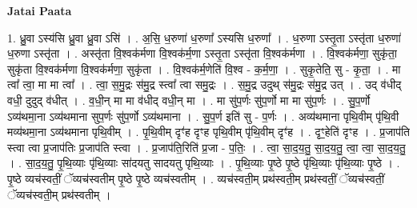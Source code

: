\documentclass[17pt]{extarticle}
\begin{document}
\textbf{Jatai Paata} \newline

1. ध्रु॒वा ऽस्य॑सि ध्रु॒वा ध्रु॒वा ऽसि॑ । . अ॒सि॒ ध॒रुणा॑ ध॒रुणा᳚ ऽस्यसि ध॒रुणा᳚ । . ध॒रुणा ऽस्तृ॒ता ऽस्तृ॑ता ध॒रुणा॑ ध॒रुणा ऽस्तृ॑ता । . अस्तृ॑ता वि॒श्वक॑र्मणा वि॒श्वक॑र्म॒णा ऽस्तृ॒ता ऽस्तृ॑ता वि॒श्वक॑र्मणा । . वि॒श्वक॑र्मणा॒ सुकृ॑ता॒ सुकृ॑ता वि॒श्वक॑र्मणा वि॒श्वक॑र्मणा॒ सुकृ॑ता । . वि॒श्वक॑र्म॒णेति॑ वि॒श्व - क॒र्म॒णा॒ । . सुकृ॒तेति॒ सु - कृ॒ता॒ । . मा त्वा᳚ त्वा॒ मा मा त्वा᳚ । . त्वा॒ स॒मु॒द्रः स॑मु॒द्र स्त्वा᳚ त्वा समु॒द्रः । . स॒मु॒द्र उदुथ् स॑मु॒द्रः स॑मु॒द्र उत् । . उद् व॑धीद् वधी॒ दुदुद् व॑धीत् । . व॒धी॒न् मा मा व॑धीद् वधी॒न् मा । . मा सु॑प॒र्णः सु॑प॒र्णो मा मा सु॑प॒र्णः । . सु॒प॒र्णो ऽव्य॑थमा॒ना ऽव्य॑थमाना सुप॒र्णः सु॑प॒र्णो ऽव्य॑थमाना । . सु॒प॒र्ण इति॑ सु - प॒र्णः । . अव्य॑थमाना पृथि॒वीम् पृ॑थि॒वी मव्य॑थमा॒ना ऽव्य॑थमाना पृथि॒वीम् । . पृ॒थि॒वीम् दृꣳ॑ह दृꣳह पृथि॒वीम् पृ॑थि॒वीम् दृꣳ॑ह । . दृꣳ॒॒हेति॑ दृꣳह । . प्र॒जाप॑ति स्त्वा त्वा प्र॒जाप॑तिः प्र॒जाप॑ति स्त्वा । . प्र॒जाप॑ति॒रिति॑ प्र॒जा - प॒तिः॒ । . त्वा॒ सा॒द॒य॒तु॒ सा॒द॒य॒तु॒ त्वा॒ त्वा॒ सा॒द॒य॒तु॒ । . सा॒द॒य॒तु॒ पृ॒थि॒व्याः पृ॑थि॒व्याः सा॑दयतु सादयतु पृथि॒व्याः । . पृ॒थि॒व्याः पृ॒ष्ठे पृ॒ष्ठे पृ॑थि॒व्याः पृ॑थि॒व्याः पृ॒ष्ठे । . पृ॒ष्ठे व्यच॑स्वतीं॒ ॅव्यच॑स्वतीम् पृ॒ष्ठे पृ॒ष्ठे व्यच॑स्वतीम् । . व्यच॑स्वती॒म् प्रथ॑स्वती॒म् प्रथ॑स्वतीं॒ ॅव्यच॑स्वतीं॒ ॅव्यच॑स्वती॒म् प्रथ॑स्वतीम् । \newline
\end{document}
